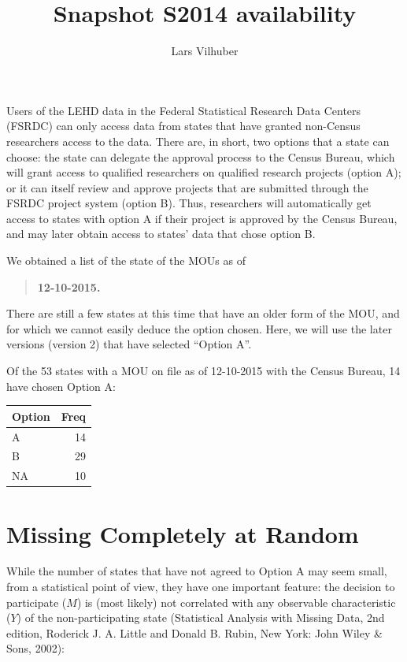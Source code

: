 \documentclass[]{article}
\title{Snapshot S2014 availability}
\author{Lars Vilhuber}
\date{}
\begin{document}
\maketitle

{
\setcounter{tocdepth}{1}
\tableofcontents
}
Users of the LEHD data in the Federal Statistical Research Data Centers
(FSRDC) can only access data from states that have granted non-Census
researchers access to the data. There are, in short, two options that a
state can choose: the state can delegate the approval process to the
Census Bureau, which will grant access to qualified researchers on
qualified research projects (option A); or it can itself review and
approve projects that are submitted through the FSRDC project system
(option B). Thus, researchers will automatically get access to states
with option A if their project is approved by the Census Bureau, and may
later obtain access to states' data that chose option B.

We obtained a list of the state of the MOUs as of

\begin{quote}
\textbf{12-10-2015.}
\end{quote}

There are still a few states at this time that have an older form of the
MOU, and for which we cannot easily deduce the option chosen. Here, we
will use the later versions (version 2) that have selected ``Option A''.

Of the 53 states with a MOU on file as of 12-10-2015 with the Census
Bureau, 14 have chosen Option A:

\begin{longtable}[c]{@{}lr@{}}
\toprule
Option & Freq\tabularnewline
\midrule
\endhead
A & 14\tabularnewline
B & 29\tabularnewline
NA & 10\tabularnewline
\bottomrule
\end{longtable}

\section{Missing Completely at
Random}\label{missing-completely-at-random}

While the number of states that have not agreed to Option A may seem
small, from a statistical point of view, they have one important
feature: the decision to participate (\(M\)) is (most likely) not
correlated with any observable characteristic (\(Y\)) of the
non-participating state (Statistical Analysis with Missing Data, 2nd
edition, Roderick J. A. Little and Donald B. Rubin, New York: John Wiley
\& Sons, 2002):
\end{document}
